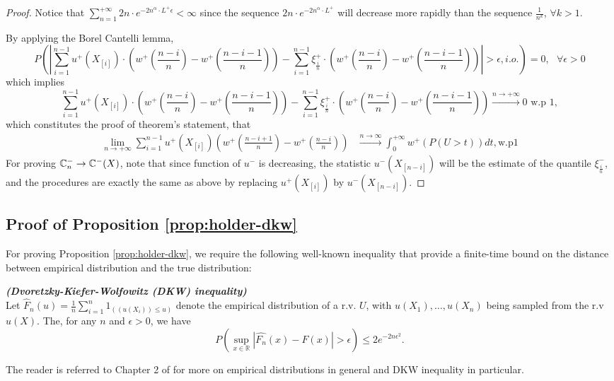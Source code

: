 \begin{proof}
Notice that $\sum_{n=1}^{+\infty}  2n \cdot e^{-2n^{\alpha}\cdot L^{+} \epsilon}< \infty$ since the sequence 
$2n \cdot e^{-2n^{\alpha}\cdot L^{+}}$ will decrease more rapidly than the sequence
$\frac{1}{n^k}$, $\forall k>1$.

By applying the Borel Cantelli lemma,
$$
P ( \left| \sum_{i=1}^{n-1} u^+(X_{[i]}) \cdot (w^+(\frac{n-i}{n} )  - w^+(\frac{n-i-1}{n} ) ) -
\sum_{i=1}^{n-1} \xi^+_{\frac{i}{n}} \cdot (w^+(\frac{n-i}{n} )  - w^+(\frac{n-i-1}{n} ) ) \right| >
\epsilon , i.o.) =0 , \text{   } \forall \epsilon >0 $$
which implies 
$$
\sum_{i=1}^{n-1} u^+(X_{[i]}) \cdot (w^+(\frac{n-i}{n} )  - w^+(\frac{n-i-1}{n} ) ) - \sum_{i=1}^{n-1}
\xi^+_{\frac{i}{n}} \cdot (w^+(\frac{n-i}{n} )  - w^+(\frac{n-i-1}{n} ) ) \xrightarrow{n \rightarrow
+\infty} 0 \text{   w.p } 1 ,
$$
which constitutes the proof of theorem's statement, that 
\begin{align}
\lim_{n\rightarrow +\infty} \sum_{i=1}^{n-1} u^+(X_{[i]}) (w^+(\frac{n-i+1}{n})- w^+(\frac{n-i}{n}))
&\xrightarrow{n \rightarrow\infty} \int_0^{+\infty} w^+(P(U>t)) dt , \text{w.p} 1
\end{align}
For proving 
$\mathbb{C}_{n}^{-} \rightarrow \mathbb{C}^{-}(X)$, note that since function of $u^{-}$ is decreasing, the statistic
$u^-(X_{[n-i]})$ will be the estimate of the quantile $\xi^{-}_{\frac{i}{n}}$, and the procedures are exactly the same as above by replacing $u^+(X_{[i]})$ by $u^-(X_{[n-i]})$. 

\end{proof}

\subsection*{Proof of Proposition \ref{prop:holder-dkw}}
For proving Proposition \ref{prop:holder-dkw}, we require the following well-known inequality that provide a finite-time bound on the distance between empirical distribution and the true distribution:
\begin{lemma}{\textbf{\textit{(Dvoretzky-Kiefer-Wolfowitz (DKW) inequality)}}}\\
Let ${\hat F_n}(u)=\frac{1}{n} \sum_{i=1}^n 1_{((u(X_i)) \leq u)}$ denote the empirical distribution of a r.v. $U$, with $u(X_1),\ldots,u(X_n)$ being sampled from the r.v $u(X)$.
The, for any $n$ and $\epsilon>0$, we have
$$
P(\sup_{x\in \mathbb{R}}|\hat{F_n}(x)-F(x)|>\epsilon ) \leq 2 e^{-2n\epsilon^2}.
$$
\end{lemma}

The reader is referred to Chapter 2 of \cite{wasserman2006} for more on empirical distributions in general and DKW inequality in particular.

